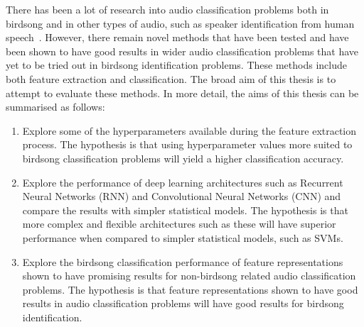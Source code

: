 There has been a lot of research into audio classification problems both in
birdsong and in other types of audio, such as speaker identification from human
speech~\cite{KUDO19991103}. However, there remain novel methods that have been
tested and have been shown to have good results in wider audio classification
problems that have yet to be tried out in birdsong identification problems.
These methods include both feature extraction and classification. The
broad aim of this thesis is to attempt to evaluate these methods. In more
detail, the aims of this thesis can be summarised as follows:

\begin{enumerate}

  \item Explore some of the hyperparameters available during the feature
    extraction process. The hypothesis is that using hyperparameter values more
    suited to birdsong classification problems will yield a higher classification
    accuracy.

  \item Explore the performance of deep learning architectures such as Recurrent
    Neural Networks (RNN) and Convolutional Neural Networks (CNN) and compare
    the results with simpler statistical models. The hypothesis is that more
    complex and flexible architectures such as these will have superior
    performance when compared to simpler statistical models, such as SVMs.

  \item Explore the birdsong classification performance of feature
    representations shown to have promising results for non-birdsong related
    audio classification problems. The hypothesis is that feature
    representations shown to have good results in audio classification problems
    will have good results for birdsong identification.

\end{enumerate}
